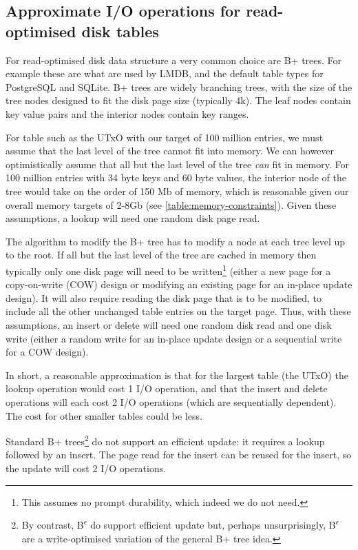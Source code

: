 \documentclass[11pt,a4paper]{article}
\begin{document}
\subsection{Approximate I/O operations for read-optimised disk tables}

For read-optimised disk data structure a very common choice are B+ trees. For
example these are what are used by LMDB, and the default table types for
PostgreSQL and SQLite. B+ trees are widely branching trees, with the size of
the tree nodes designed to fit the disk page size (typically 4k). The leaf
nodes contain key value pairs and the interior nodes contain key ranges.

For table such as the UTxO with our target of 100 million entries, we must
assume that the last level of the tree cannot fit into memory. We can however
optimistically assume that all but the last level of the tree \emph{can} fit in
memory. For 100 million entries with 34 byte keys and 60 byte values, the
interior node of the tree would take on the order of 150 Mb of memory, which is
reasonable given our overall memory targets of 2-8Gb (see
\cref{table:memory-constraints}). Given these assumptions, a {\sc lookup} will
need one random disk page read.

The algorithm to modify the B+ tree has to modify a node at each tree level up
to the root. If all but the last level of the tree are cached in memory then
typically only one disk page will need to be written\footnote{This assumes no
prompt durability, which indeed we do not need.} (either a new page for a
copy-on-write (COW) design or modifying an existing page for an in-place update
design). It will also require reading the disk page that is to be modified,
to include all the other unchanged table entries on the target page. Thus, with
these assumptions, an {\sc insert} or {\sc delete} will need one random disk
read and one disk write (either a random write for an in-place update design or
a sequential write for a COW design).

In short, a reasonable approximation is that for the largest table (the UTxO)
the {\sc lookup} operation would cost 1 I/O operation, and that the {\sc insert}
and {\sc delete} operations will each cost 2 I/O operations (which are
sequentially dependent). The cost for other smaller tables could be less.

Standard B+ trees\footnote{By contrast, B\textsuperscript{$\epsilon$} do
support efficient {\sc update} but, perhaps unsurprisingly,
B\textsuperscript{$\epsilon$} are a write-optimised variation of the general B+
tree idea.} do not support an efficient {\sc update}: it requires a lookup
followed by an insert. The page read for the insert can be reused for the
insert, so the {\sc update} will cost 2 I/O operations.
\end{document}
